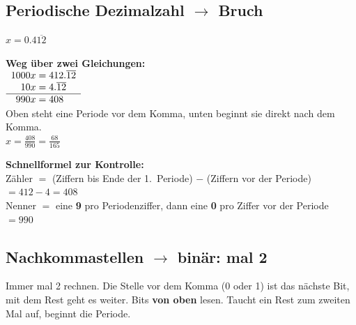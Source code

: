 \subsection*{Periodische Dezimalzahl $\to$ Bruch}
\begin{beispiel}{$x = 0.4\overline{12}$}
  \begin{minipage}[t]{0.5\linewidth}
    \textbf{Weg über zwei Gleichungen:}\\[2pt]
    $\begin{array}{r@{\;=\;}l}
      1000x & 412.\overline{12}\\
      10x & 4.\overline{12}\\ \hline
      990x & 408
    \end{array}$\\[2pt]
    {\small Oben steht eine Periode vor dem Komma, unten beginnt sie direkt
    nach dem Komma.}\\[4pt]
    $x = \frac{408}{990} = \frac{68}{165}$
  \end{minipage}\hfill
  \begin{minipage}[t]{0.45\linewidth}
    \textbf{Schnellformel zur Kontrolle:}\\[2pt]
    Zähler $=$ (Ziffern bis Ende der 1.\ Periode) $-$ (Ziffern vor der Periode)
    $= 412 - 4 = 408$\\[2pt]
    Nenner $=$ eine \textbf{9} pro Periodenziffer, dann eine \textbf{0} pro Ziffer vor
    der Periode $= 990$
  \end{minipage}
\end{beispiel}

\subsection*{Nachkommastellen $\to$ binär: mal 2}
Immer mal 2 rechnen. Die Stelle vor dem Komma (0 oder 1) ist das nächste Bit, mit
dem Rest geht es weiter. Bits \textbf{von oben} lesen. Taucht ein Rest zum zweiten
Mal auf, beginnt die Periode.

